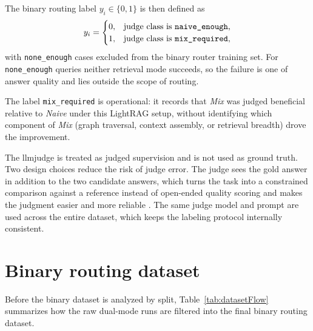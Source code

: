 \documentclass[english, bibtex]{kththesis}               %
\numberwithin{listing}{chapter}
\begin{document}
The binary routing label \(y_i \in \{0, 1\}\) is then defined as
\begin{equation}
\label{eq:routingLabel}
y_i =
\begin{cases}
0, & \text{judge class is \texttt{naive\_enough},}\\
1, & \text{judge class is \texttt{mix\_required},}
\end{cases}
\end{equation}
with \texttt{none\_enough} cases excluded from the binary router training set. For \texttt{none\_enough} queries neither retrieval mode succeeds, so the failure is one of answer quality and lies outside the scope of routing.

The label \texttt{mix\_required} is operational: it records that \emph{Mix} was judged beneficial relative to \emph{Naive} under this LightRAG setup, without identifying which component of \emph{Mix} (graph traversal, context assembly, or retrieval breadth) drove the improvement.

The \gls{llmjudge} is treated as judged supervision and is not used as ground truth. Two design choices reduce the risk of judge error. The judge sees the gold answer in addition to the two candidate answers, which turns the task into a constrained comparison against a reference instead of open-ended quality scoring and makes the judgment easier and more reliable \cite{zheng2023judge}. The same judge model and prompt are used across the entire dataset, which keeps the labeling protocol internally consistent.

\section{Binary routing dataset}
\label{sec:methodDataset}

Before the binary dataset is analyzed by split, Table~\ref{tab:datasetFlow} summarizes how the raw dual-mode runs are filtered into the final binary routing dataset.
\end{document}
